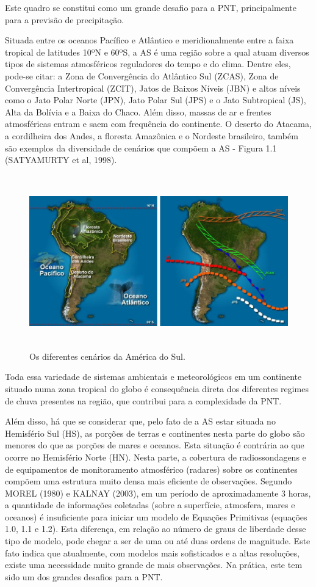 Este quadro se constitui como um grande desafio para a PNT, principalmente para a previsão de precipitação.

Situada entre os oceanos Pacífico e Atlântico e meridionalmente entre a faixa tropical de latitudes 10ºN e 60ºS, a AS é uma região sobre a qual atuam diversos tipos de sistemas atmosféricos reguladores do tempo e do clima. Dentre eles, pode-se citar: a Zona de Convergência do Atlântico Sul (ZCAS), Zona de Convergência Intertropical (ZCIT), Jatos de Baixos Níveis (JBN) e altos níveis como o Jato Polar Norte (JPN), Jato Polar Sul (JPS) e o Jato Subtropical (JS), Alta da Bolívia e a Baixa do Chaco. Além disso, massas de ar e frentes atmosféricas entram e saem com frequência do continente. O deserto do Atacama, a cordilheira dos Andes, a floresta Amazônica e o Nordeste brasileiro, também são exemplos da diversidade de cenários que compõem a AS - Figura 1.1 (SATYAMURTY et al, 1998).

\begin{figure}
\centering
\includegraphics[height=7.5cm]{./figs/fig02.png}
\caption{Os diferentes cenários da América do Sul.}
\label{fig02}
\end{figure}

Toda essa variedade de sistemas ambientais e meteorológicos em um continente situado numa zona tropical do globo é consequência direta dos diferentes regimes de chuva presentes na região, que contribui para a complexidade da PNT.

Além disso, há que se considerar que, pelo fato de a AS estar situada no Hemisfério Sul (HS), as porções de terras e continentes nesta parte do globo são menores do que as porções de mares e oceanos. Esta situação é contrária ao que ocorre no Hemisfério Norte (HN). Nesta parte, a cobertura de radiossondagens e de equipamentos de monitoramento atmosférico (radares) sobre os continentes compõem uma estrutura muito densa mais eficiente de observações. Segundo MOREL (1980) e KALNAY (2003), em um período de aproximadamente 3 horas, a quantidade de informações coletadas (sobre a superfície, atmosfera, mares e oceanos) é insuficiente para iniciar um modelo de Equações Primitivas (equações 1.0, 1.1 e 1.2). Esta diferença, em relação ao número de graus de liberdade desse tipo de modelo, pode chegar a ser de uma ou até duas ordens de magnitude. Este fato indica que atualmente, com modelos mais sofisticados e a altas resoluções, existe uma necessidade muito grande de mais observações. Na prática, este tem sido um dos grandes desafios para a PNT. 

